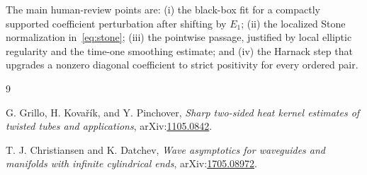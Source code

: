 \documentclass[11pt]{article}
\begin{document}
The main human-review points are: (i) the black-box fit for a compactly
supported coefficient perturbation after shifting by \(E_1\); (ii) the
localized Stone normalization in~\eqref{eq:stone}; (iii) the pointwise
passage, justified by local elliptic regularity and the time-one smoothing
estimate; and (iv) the Harnack step that upgrades a nonzero diagonal
coefficient to strict positivity for every ordered pair.

\begin{thebibliography}{9}

G. Grillo, H. Kova\v{r}\'ik, and Y. Pinchover,
\emph{Sharp two-sided heat kernel estimates of twisted tubes and
applications}, arXiv:\href{https://arxiv.org/abs/1105.0842}{1105.0842}.

T. J. Christiansen and K. Datchev,
\emph{Wave asymptotics for waveguides and manifolds with infinite
cylindrical ends},
arXiv:\href{https://arxiv.org/abs/1705.08972}{1705.08972}.

\end{thebibliography}
\end{document}
